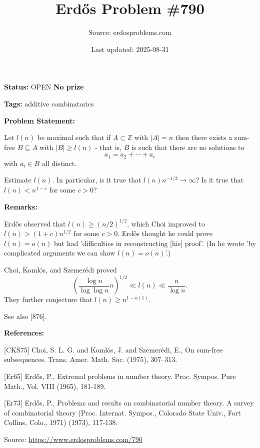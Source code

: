 \documentclass{article}
\title{Erd\H{o}s Problem \#790}
\date{Last updated: 2025-08-31}
\author{Source: erdosproblems.com}
\begin{document}
\maketitle

\noindent\textbf{Status:} OPEN \quad \textbf{No prize}

\noindent\textbf{Tags:} additive combinatorics

\medskip
\noindent\textbf{Problem Statement:}

Let $l(n)$ be maximal such that if $A\subset\mathbb{Z}$ with $\lvert A\rvert=n$ then there exists a sum-free $B\subseteq A$ with $\lvert B\rvert \geq l(n)$ - that is, $B$ is such that there are no solutions to\[a_1=a_2+\cdots+a_r\]with $a_i\in B$ all distinct.

Estimate $l(n)$. In particular, is it true that $l(n)n^{-1/2}\to \infty$? Is it true that $l(n)< n^{1-c}$ for some $c>0$?

\bigskip
\noindent\textbf{Remarks:}

Erd\H{o}s observed that $l(n)\geq (n/2)^{1/2}$, which Choi improved to $l(n)>(1+c)n^{1/2}$ for some $c>0$. Erd\H{o}s \cite{Er73} thought he could prove $l(n)=o(n)$ but had 'difficulties in reconstructing [his] proof'. (In \cite{Er65} he wrote 'by complicated arguments we can show $l(n)=o(n)$'.)

Choi, Koml\'{o}s, and Szemer\'{e}di \cite{CKS75} proved\[\left(\frac{\log n}{\log\log n}n\right)^{1/2}\ll l(n) \ll \frac{n}{\log n}.\]They further conjecture that $l(n)\geq n^{1-o(1)}$. 

See also [876].

\bigskip
\noindent\textbf{References:}

[CKS75] Choi, S. L. G. and Koml\'os, J. and Szemer\'{e}di, E., On sum-free subsequences. Trans. Amer. Math. Soc. (1975), 307--313.
 
 [Er65] Erd\H{o}s, P., Extremal problems in number theory. Proc. Sympos. Pure Math., Vol. VIII (1965), 181-189.
 
 [Er73] Erd\H{o}s, P., Problems and results on combinatorial number theory. A survey of combinatorial theory (Proc. Internat. Sympos., Colorado State Univ., Fort Collins, Colo., 1971) (1973), 117-138.

\bigskip
\noindent\small{Source: \url{https://www.erdosproblems.com/790}}
\end{document}
